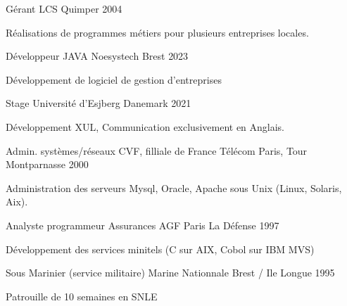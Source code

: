 \begin{cventries}
   \cventry
   {Gérant} %
   {LCS} %
   {Quimper} %
   {2004} %
   {
     \begin{cvitems} %
       \item {Réalisations de programmes métiers pour plusieurs entreprises locales.}
     \end{cvitems}
   }
   \cventry
   {Développeur JAVA } %
   {Noesystech} %
   {Brest} %
   {2023} %
   {
     \begin{cvitems} %
       \item {Développement de logiciel de gestion d'entreprises}
     \end{cvitems}
   }
  \cventry
  {Stage} %
  {Université d'Esjberg} %
  {Danemark} %
  {2021} %
  {
    \begin{cvitems} %
      \item {Développement XUL, Communication exclusivement en Anglais.}
    \end{cvitems}
  }
  \cventry
  {Admin. systèmes/réseaux} %
  {CVF, filliale de France Télécom } %
  {Paris, Tour Montparnasse} %
  {2000} %
  {
    \begin{cvitems} %
      \item {Administration des serveurs Mysql, Oracle, Apache sous Unix (Linux, Solaris, Aix).}
    \end{cvitems}
  }
  \cventry
  {Analyste programmeur} %
  {Assurances AGF} %
  {Paris La Défense} %
  {1997} %
  {
    \begin{cvitems} %
      \item {Développement des services minitels (C sur AIX, Cobol sur IBM MVS)}
    \end{cvitems}
  }

\cventry
{Sous Marinier (service militaire)} %
{Marine Nationnale} %
{Brest / Ile Longue} %
{1995} %
{
  \begin{cvitems} %
    \item {Patrouille de 10 semaines en SNLE}
  \end{cvitems}
}
\end{cventries}
